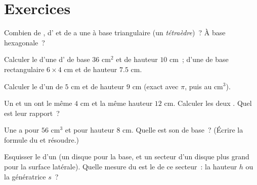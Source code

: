 \section{Exercices}

\begin{exercise}[$\star$]\label{exo:g8:solids:1}
Combien de , d' et de  a une  à base
triangulaire (un \emph{tétraèdre})~? À base hexagonale~?
\end{exercise}

\begin{exercise}[$\star$]\label{exo:g8:solids:2}
Calculer le  d'une  d' de base $36$ cm$^2$ et de
hauteur $10$ cm~; d'une  de base rectangulaire
$6 \times 4$ cm et de hauteur $7.5$ cm.
\end{exercise}

\begin{exercise}[$\star$]\label{exo:g8:solids:3}
Calculer le  d'un  de  $5$ cm et de hauteur $9$ cm
(exact avec $\pi$, puis  au cm$^3$).
\end{exercise}

\begin{exercise}[$\star$]\label{exo:g8:solids:4}
Un  et un  ont le même  $4$ cm et la même hauteur
$12$ cm. Calculer les deux . Quel est leur rapport~?
\end{exercise}

\begin{exercise}[$\star$]\label{exo:g8:solids:5}
Une  a pour  $56$ cm$^3$ et pour hauteur $8$ cm. Quelle
est son  de base~? (Écrire la formule du  et résoudre.)
\end{exercise}

\begin{exercise}[$\star$]\label{exo:g8:solids:6}
Esquisser le  d'un  (un disque pour la base, et un secteur
d'un disque plus grand pour la surface latérale). Quelle mesure du
 est le  de ce secteur~: la hauteur $h$ ou la génératrice
$s$~?
\end{exercise}

